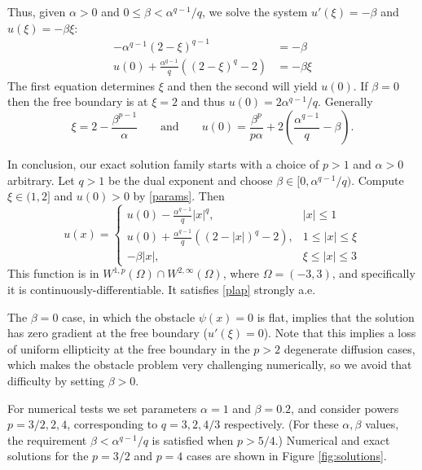 \documentclass[11pt]{amsart}
\begin{document}
Thus, given $\alpha>0$ and $0 \le \beta < \alpha^{q-1}/q$, we solve the system $u'(\xi)=-\beta$ and $u(\xi)=-\beta \xi$:
\begin{align*}
-\alpha^{q-1} (2 - \xi)^{q-1} &= -\beta \\
u(0) + \frac{\alpha^{q-1}}{q} \left( (2 - \xi)^q - 2 \right) &= -\beta \xi
\end{align*}
The first equation determines $\xi$ and then the second will yield $u(0)$.  If $\beta=0$ then the free boundary is at $\xi=2$ and thus $u(0) = 2 \alpha^{q-1} / q$.  Generally
\begin{equation}
\boxed{\xi = 2 - \frac{\beta^{p-1}}{\alpha} \qquad \text{and} \qquad u(0) = \frac{\beta^p}{p \alpha} + 2 \left(\frac{\alpha^{q-1}}{q} - \beta\right).} \label{params}
\end{equation}

In conclusion, our exact solution family starts with a choice of $p>1$ and $\alpha>0$ arbitrary.  Let $q>1$ be the dual exponent and choose $\beta \in [0,\alpha^{q-1}/q)$.  Compute $\xi \in (1,2]$ and $u(0)>0$ by \eqref{params}.  Then 
\begin{equation}
\boxed{u(x) = \begin{cases} u(0) - \frac{\alpha^{q-1}}{q} |x|^q, & |x| \le 1 \\
                      u(0) + \frac{\alpha^{q-1}}{q} \left( (2 - |x|)^q - 2 \right), & 1 \le |x| \le \xi \\
                      -\beta |x|, & \xi \le |x| \le 3\end{cases}}  \label{exact}
\end{equation}
This function is in $W^{1,p}(\Omega) \cap W^{2,\infty}(\Omega)$, where $\Omega = (-3,3)$, and specifically it is continuously-differentiable.  It satisfies \eqref{plap} strongly a.e.

The $\beta=0$ case, in which the obstacle $\psi(x)=0$ is flat, implies that the solution has zero gradient at the free boundary ($u'(\xi)=0$).  Note that this implies a loss of uniform ellipticity at the free boundary in the $p>2$ degenerate diffusion cases, which makes the obstacle problem very challenging numerically, so we avoid that difficulty by setting $\beta>0$.

For numerical tests we set parameters $\alpha=1$ and $\beta = 0.2$, and consider powers $p=3/2,2,4$, corresponding to $q=3,2,4/3$ respectively.  (For these $\alpha,\beta$ values, the requirement $\beta < \alpha^{q-1}/q$ is satisfied when $p > 5/4$.)  Numerical and exact solutions for the $p=3/2$ and $p=4$ cases are shown in Figure \ref{fig:solutions}.
\end{document}
